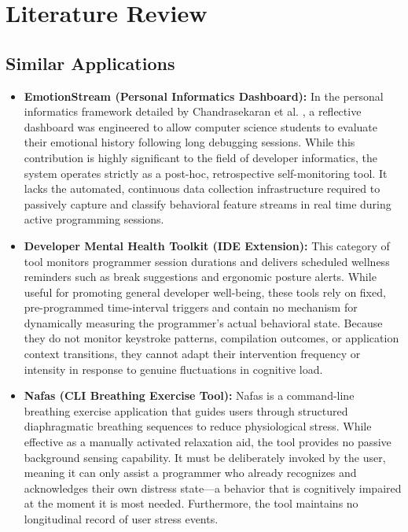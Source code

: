 \section{Literature Review}

\subsection{Similar Applications}
\begin{itemize}
    \item \textbf{EmotionStream (Personal Informatics Dashboard):} In the personal informatics framework detailed by Chandrasekaran et al. \cite{mdpi5739}, a reflective dashboard was engineered to allow computer science students to evaluate their emotional history following long debugging sessions. While this contribution is highly significant to the field of developer informatics, the system operates strictly as a post-hoc, retrospective self-monitoring tool. It lacks the automated, continuous data collection infrastructure required to passively capture and classify behavioral feature streams in real time during active programming sessions.

    \item \textbf{Developer Mental Health Toolkit (IDE Extension):} This category of tool monitors programmer session durations and delivers scheduled wellness reminders such as break suggestions and ergonomic posture alerts. While useful for promoting general developer well-being, these tools rely on fixed, pre-programmed time-interval triggers and contain no mechanism for dynamically measuring the programmer's actual behavioral state. Because they do not monitor keystroke patterns, compilation outcomes, or application context transitions, they cannot adapt their intervention frequency or intensity in response to genuine fluctuations in cognitive load.

    \item \textbf{Nafas (CLI Breathing Exercise Tool):} Nafas is a command-line breathing exercise application that guides users through structured diaphragmatic breathing sequences to reduce physiological stress. While effective as a manually activated relaxation aid, the tool provides no passive background sensing capability. It must be deliberately invoked by the user, meaning it can only assist a programmer who already recognizes and acknowledges their own distress state---a behavior that is cognitively impaired at the moment it is most needed. Furthermore, the tool maintains no longitudinal record of user stress events.


\end{itemize}
